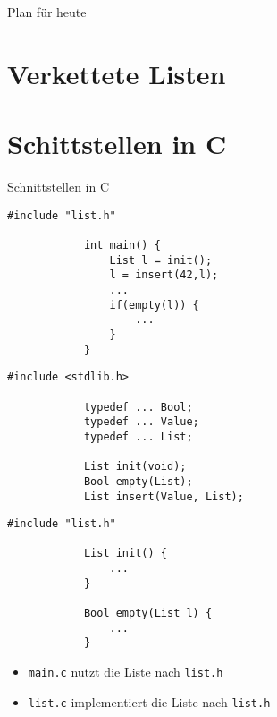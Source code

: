 \documentclass[10pt]{beamer} %
\date{}
\begin{document}
\maketitle

\begin{frame}{Plan für heute}

	\tableofcontents

\end{frame}

\section{Verkettete Listen}


\section{Schittstellen in C}

\begin{frame}[fragile]{Schnittstellen in C}

	\begin{minipage}[t]{0.25\linewidth}
		\begin{lstlisting}[gobble=6,title=main.c,basicstyle=\scriptsize\ttfamily]
			#include "list.h"
			
			int main() {
				List l = init();
				l = insert(42,l);
				...
				if(empty(l)) {
					...
				}
			}
		\end{lstlisting}
	\end{minipage}
	\qquad
	\begin{minipage}[t]{0.33\linewidth}
		\begin{lstlisting}[gobble=6,title=list.h,basicstyle=\scriptsize\ttfamily]
			#include <stdlib.h>
			
			typedef ... Bool;
			typedef ... Value;
			typedef ... List;
			
			List init(void);
			Bool empty(List);
			List insert(Value, List);
		\end{lstlisting}
	\end{minipage}
	\qquad
	\begin{minipage}[t]{0.26\linewidth}
		\begin{lstlisting}[gobble=6,title=list.c,basicstyle=\scriptsize\ttfamily]
			#include "list.h"
			
			List init() {
				...
			}
			
			Bool empty(List l) {
				...
			}
		\end{lstlisting}
	\end{minipage}
	
	\begin{itemize}
		\item \texttt{main.c} nutzt die Liste nach \texttt{list.h}
		\item \texttt{list.c} implementiert die Liste nach \texttt{list.h}
	\end{itemize}

\end{frame}
\end{document}
